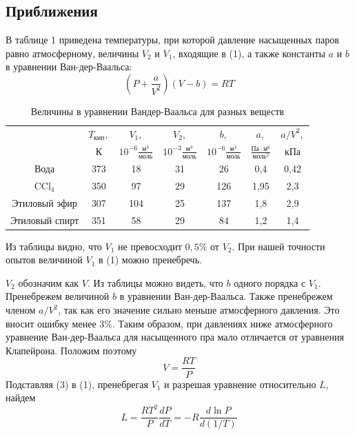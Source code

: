 \documentclass[a4paper,12pt]{article}
\theoremstyle{plain} %
\theoremstyle{definition} %
\theoremstyle{remark} %
\begin{document}
	\subsection{Приближения}
	В таблице 1 приведена температуры, при которой давление насыщенных паров равно атмосферному, величины $V_2$ и $V_1$, входящие в (1), а также константы $a$ и $b$ в уравнении Ван-дер-Ваальса:
	\begin{equation}
	\left(P+\frac{a}{V^2}\right)(V - b) = RT
	\end{equation}
	\begin{table}[H]
	\begin{center}
		\begin{tabular}{|c|c|c|c|c|c|c|}
			\hline
			\rule{0ex}{3ex}
			\multirow{2}{*}{Вещество} &$T_\text{кип},$ & $V_1,$ & $V_2,$ & $b,$ & $a,$ & $a/V^2,$ \\ 
			& $\text{К}$ & $10^{-6} \frac{\text{м}^3}{\text{моль}}$ & $10^{-3} \frac{\text{м}^3}{\text{моль}}$ & $10^{-6} \frac{\text{м}^3}{\text{моль}}$ & $\frac{\text{Па}\cdot \text{м}^6}{\text{моль}^2}$  & $\text{кПа}$ \\[1ex] \hline
			\rule{0ex}{2.5ex}
			Вода &373 & 18 & 31 & 26 & 0,4 & 0,42 \\ \hline
			\rule{0ex}{2.5ex}
			CCl$_4$&350 & 97 & 29 & 126 & 1,95 & 2,3 \\ \hline
			\rule{0ex}{2.5ex}
			Этиловый эфир &307& 104 & 25 & 137 & 1,8 & 2,9 \\ \hline
			\rule{0ex}{2.5ex}
			Этиловый спирт &351 & 58 & 29 & 84 & 1,2 & 1,4\\ \hline
		\end{tabular}
	\end{center}
\caption {Величины в уравнении Вандер-Ваальса для разных веществ}
\end{table}

Из таблицы видно, что $V_1$ не превосходит $0,5\%$ от $V_2$. При нашей точности опытов величиной $V_1$ в (1) можно пренебречь.

$V_2$ обозначим как $V$. Из таблицы можно видеть, что $b$ одного порядка с $V_1$. Пренебрежем величиной $b$ в уравнении Ван-дер-Ваальса. Также пренебрежем  членом $a/V^2$, так как его значение сильно меньше атмосферного давления. Это вносит ошибку менее $3\%$. Таким образом, при давлениях ниже атмосферного уравнение Ван-дер-Ваальса для насыщенного пра мало отличается от уравнения Клапейрона. Положим поэтому
\begin{equation}
V = \frac{RT}{P}
\end{equation} 
Подставляя (3) в (1), пренебрегая $V_1$ и разрешая уравнение относительно $L$, найдем
\begin{equation}
L = \frac{RT^2}{P}\frac{dP}{dT} = -R\frac{d\ln P}{d(1/T)}
\end{equation}
\end{document}
